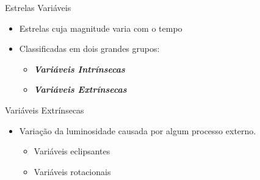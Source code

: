 \documentclass{beamer}
\begin{document}
\begin{frame}{Estrelas Variáveis}
  \begin{itemize}
    \item Estrelas cuja magnitude varia com o tempo
    \item Classificadas em dois grandes grupos:
    \begin{itemize}
      \item \textit{\textbf{Variáveis Intrínsecas}}
      \item \textit{\textbf{Variáveis Extrínsecas}}
    \end{itemize}
  \end{itemize}



\end{frame}


\begin{frame}{Variáveis Extrínsecas}
\begin{itemize}
  \item Variação da luminosidade causada por algum processo externo.
  \begin{itemize}
    \item Variáveis eclipsantes
    \item Variáveis rotacionais
  \end{itemize}
\end{itemize}
\end{frame}
\end{document}

